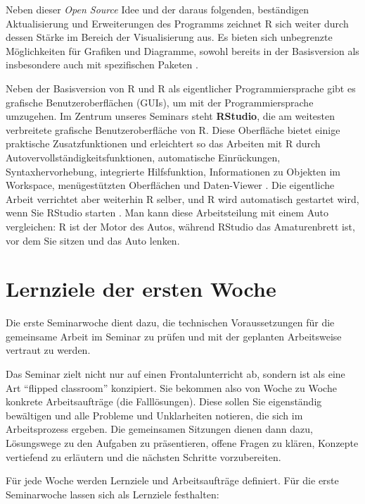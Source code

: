 \documentclass[
]{book}
\begin{document}
Neben dieser \emph{Open Source} Idee und der daraus folgenden, beständigen Aktualisierung und Erweiterungen des Programms zeichnet R sich weiter durch dessen Stärke im Bereich der Visualisierung aus. Es bieten sich unbegrenzte Möglichkeiten für Grafiken und Diagramme, sowohl bereits in der Basisversion als insbesondere auch mit spezifischen Paketen \citep[siehe][]{R-ggplot2}.

Neben der Basisversion von R und R als eigentlicher Programmiersprache gibt es grafische Benutzeroberflächen (GUIs), um mit der Programmiersprache umzugehen. Im Zentrum unseres Seminars steht \textbf{RStudio}, die am weitesten verbreitete grafische Benutzeroberfläche von R. Diese Oberfläche bietet einige praktische Zusatzfunktionen und erleichtert so das Arbeiten mit R durch Autovervollständigkeitsfunktionen, automatische Einrückungen, Syntaxhervorhebung, integrierte Hilfsfunktion, Informationen zu Objekten im Workspace, menügestützten Oberflächen und Daten-Viewer \citep[18]{Manderscheid2017}. Die eigentliche Arbeit verrichtet aber weiterhin R selber,
und R wird automatisch gestartet wird, wenn Sie RStudio starten \citep[21]{Sauer2019}. Man kann diese Arbeitsteilung mit einem Auto vergleichen: R ist der Motor des Autos, während RStudio das Amaturenbrett ist, vor dem Sie sitzen und das Auto lenken.

\hypertarget{lernziele-der-ersten-woche}{%
\section{Lernziele der ersten Woche}\label{lernziele-der-ersten-woche}}

Die erste Seminarwoche dient dazu, die technischen Voraussetzungen für die gemeinsame Arbeit im Seminar zu prüfen und mit der geplanten Arbeitsweise vertraut zu werden.

Das Seminar zielt nicht nur auf einen Frontalunterricht ab, sondern ist als eine Art ``flipped classroom'' konzipiert. Sie bekommen also von Woche zu Woche konkrete Arbeitsaufträge (die Falllösungen). Diese sollen Sie eigenständig bewältigen und alle Probleme und Unklarheiten notieren, die sich im Arbeitsprozess ergeben. Die gemeinsamen Sitzungen dienen dann dazu, Lösungswege zu den Aufgaben zu präsentieren, offene Fragen zu klären, Konzepte vertiefend zu erläutern und die nächsten Schritte vorzubereiten.

Für jede Woche werden Lernziele und Arbeitsaufträge definiert. Für die erste Seminarwoche lassen sich als Lernziele festhalten:
\end{document}
